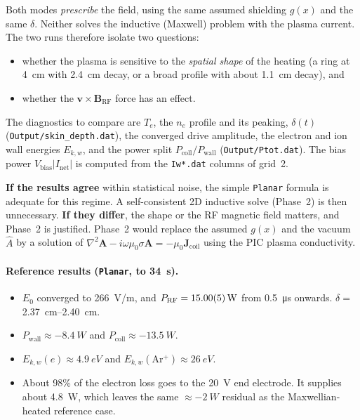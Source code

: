 \documentclass[11pt,a4paper]{article}
\newcommand{\Ahat}{\hat{A}}
\newcommand{\code}[1]{\texttt{#1}}
\begin{document}
Both modes \emph{prescribe} the field, using the same assumed shielding
$g(x)$ and the same $\delta$. Neither solves the inductive (Maxwell) problem
with the plasma current. The two runs therefore isolate two questions:
\begin{itemize}
  \item whether the plasma is sensitive to the \emph{spatial shape} of the
        heating (a ring at 4~cm with 2.4~cm decay, or a broad profile with
        about 1.1~cm decay), and
  \item whether the $\mathbf v\times\mathbf B_{\mathrm{RF}}$ force has an
        effect.
\end{itemize}
The diagnostics to compare are $T_e$, the $n_e$ profile and its peaking,
$\delta(t)$ (\code{Output/skin\_depth.dat}), the converged drive amplitude,
the electron and ion wall energies $E_{k,w}$, and the power split
$P_{\mathrm{coll}}/P_{\mathrm{wall}}$ (\code{Output/Ptot.dat}). The bias
power $V_{\mathrm{bias}} |I_{\mathrm{net}}|$ is computed from the
\code{Iw*.dat} columns of grid~2.

\textbf{If the results agree} within statistical noise, the simple
\code{Planar} formula is adequate for this regime. A self-consistent 2D
inductive solve (Phase~2) is then unnecessary.
\textbf{If they differ}, the shape or the RF magnetic field matters, and
Phase~2 is justified. Phase~2 would replace the assumed $g(x)$ and the
vacuum $\Ahat$ by a solution of
$\nabla^2 \mathbf A - i\omega\mu_0\sigma\mathbf A = -\mu_0 \mathbf J_{\mathrm{coil}}$
using the PIC plasma conductivity.

\paragraph{Reference results (\code{Planar}, to 34~\textmu s).}
\begin{itemize}
  \item $E_0$ converged to \SI{266}{V/m}, and $P_{\mathrm{RF}} =
        \SI{15.00 \pm 0.05}{W}$ from \SI{0.5}{\micro s} onwards.
        $\delta = $ \SIrange{2.37}{2.40}{cm}.
  \item $P_{\mathrm{wall}} \approx \SI{-8.4}{W}$ and
        $P_{\mathrm{coll}} \approx \SI{-13.5}{W}$.
  \item $E_{k,w}(e) \approx \SI{4.9}{eV}$ and
        $E_{k,w}(\mathrm{Ar^+}) \approx \SI{26}{eV}$.
  \item About 98\% of the electron loss goes to the \SI{+20}{V} end
        electrode. It supplies about \SI{4.8}{W}, which leaves the same
        $\approx\SI{-2}{W}$ residual as the Maxwellian-heated reference case.
\end{itemize}
\end{document}

